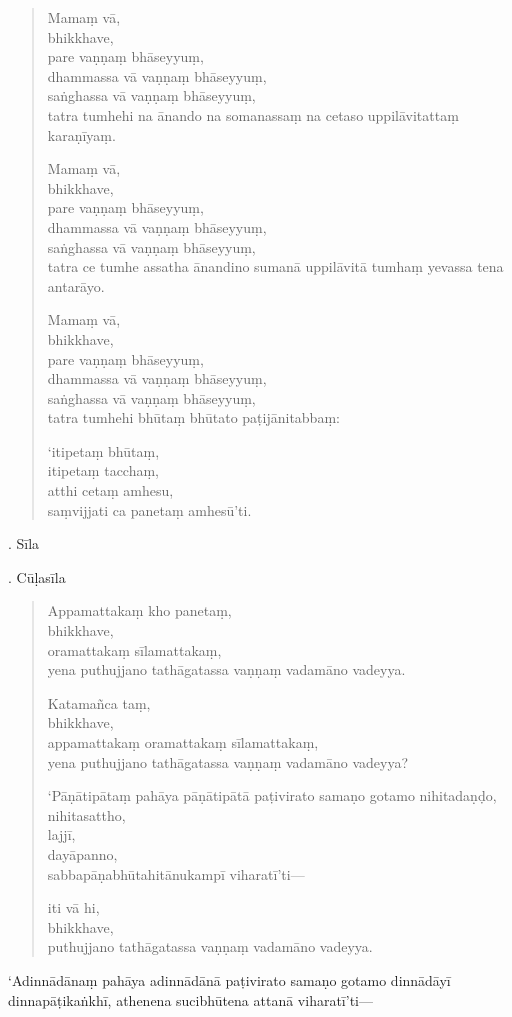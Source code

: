 \documentclass[11pt,twoside,openright]{book}
\begin{document}
\begin{verse}
Mamaṃ vā,\\
\vin  bhikkhave,\\
\vin  pare vaṇṇaṃ bhāseyyuṃ,\\
\vin  dhammassa vā vaṇṇaṃ bhāseyyuṃ,\\
\vin  saṅghassa vā vaṇṇaṃ bhāseyyuṃ,\\
\vin  tatra tumhehi na ānando na somanassaṃ na cetaso uppilāvitattaṃ karaṇīyaṃ.

Mamaṃ vā,\\
\vin  bhikkhave,\\
\vin  pare vaṇṇaṃ bhāseyyuṃ,\\
\vin  dhammassa vā vaṇṇaṃ bhāseyyuṃ,\\
\vin  saṅghassa vā vaṇṇaṃ bhāseyyuṃ,\\
\vin  tatra ce tumhe assatha ānandino sumanā uppilāvitā tumhaṃ yevassa tena antarāyo.

Mamaṃ vā,\\
\vin  bhikkhave,\\
\vin  pare vaṇṇaṃ bhāseyyuṃ,\\
\vin  dhammassa vā vaṇṇaṃ bhāseyyuṃ,\\
\vin  saṅghassa vā vaṇṇaṃ bhāseyyuṃ,\\
\vin  tatra tumhehi bhūtaṃ bhūtato paṭijānitabbaṃ:

‘itipetaṃ bhūtaṃ,\\
\vin  itipetaṃ tacchaṃ,\\
\vin  atthi cetaṃ amhesu,\\
\vin  saṃvijjati ca panetaṃ amhesū’ti.

\end{verse}
. Sīla
\pend

. Cūḷasīla
\pend

\begin{verse}
Appamattakaṃ kho panetaṃ,\\
\vin  bhikkhave,\\
\vin  oramattakaṃ sīlamattakaṃ,\\
\vin  yena puthujjano tathāgatassa vaṇṇaṃ vadamāno vadeyya.

Katamañca taṃ,\\
\vin  bhikkhave,\\
\vin  appamattakaṃ oramattakaṃ sīlamattakaṃ,\\
\vin  yena puthujjano tathāgatassa vaṇṇaṃ vadamāno vadeyya?

‘Pāṇātipātaṃ pahāya pāṇātipātā paṭivirato samaṇo gotamo nihitadaṇḍo,\\
\vin  nihitasattho,\\
\vin  lajjī,\\
\vin  dayāpanno,\\
\vin  sabbapāṇabhūtahitānukampī viharatī’ti—

iti vā hi,\\
\vin  bhikkhave,\\
\vin  puthujjano tathāgatassa vaṇṇaṃ vadamāno vadeyya.

\end{verse}
\pstart
‘Adinnādānaṃ pahāya adinnādānā paṭivirato samaṇo gotamo dinnādāyī dinnapāṭikaṅkhī, athenena sucibhūtena attanā viharatī’ti—
\pend
\end{document}
